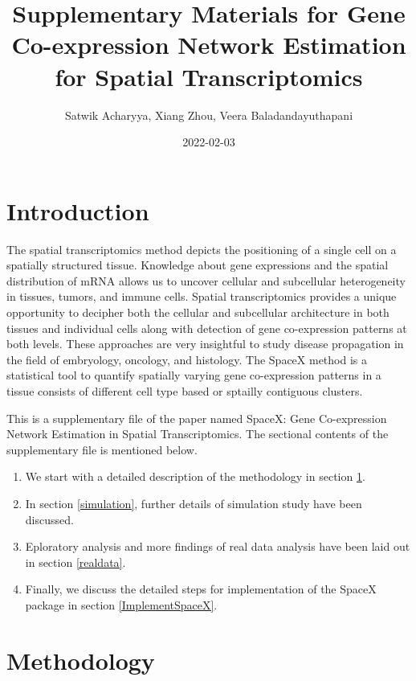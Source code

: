 \documentclass[
]{book}
\title{Supplementary Materials for Gene Co-expression Network Estimation for Spatial Transcriptomics}
\author{Satwik Acharyya, Xiang Zhou, Veera Baladandayuthapani}
\date{2022-02-03}
\providecommand{\tightlist}{%
  \setlength{\itemsep}{0pt}\setlength{\parskip}{0pt}}
\begin{document}
\maketitle

{
\setcounter{tocdepth}{1}
\tableofcontents
}
\hypertarget{appendix-supplementary-materials}{%
\appendix}


\hypertarget{introduction}{%
\chapter*{Introduction}\label{introduction}}

The spatial transcriptomics method depicts the positioning of a single cell on a spatially structured tissue. Knowledge about gene expressions and the spatial distribution of mRNA allows us to uncover cellular and subcellular heterogeneity in tissues, tumors, and immune cells. Spatial transcriptomics provides a unique opportunity to decipher both the cellular and subcellular architecture in both tissues and individual cells along with detection of gene co-expression patterns at both levels. These approaches are very insightful to study disease propagation in the field of embryology, oncology, and histology. The SpaceX method is a statistical tool to quantify spatially varying gene co-expression patterns in a tissue consists of different cell type based or sptailly contiguous clusters.

This is a supplementary file of the paper named SpaceX: Gene Co-expression Network Estimation in Spatial Transcriptomics. The sectional contents of the supplementary file is mentioned below.

\begin{enumerate}
\def\labelenumi{\arabic{enumi}.}
\tightlist
\item
  We start with a detailed description of the methodology in section \ref{method}.
\item
  In section \ref{simulation}, further details of simulation study have been discussed.
\item
  Eploratory analysis and more findings of real data analysis have been laid out in section \ref{realdata}.
\item
  Finally, we discuss the detailed steps for implementation of the SpaceX package in section \ref{ImplementSpaceX}.
\end{enumerate}

\hypertarget{method}{%
\chapter{Methodology}\label{method}}
\end{document}
